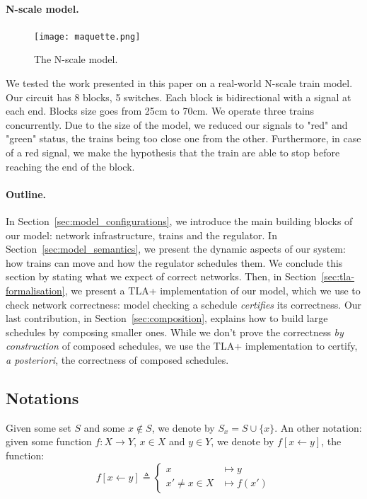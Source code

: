 \documentclass[runningheads]{llncs}
\begin{document}
\paragraph{N-scale model.}
\begin{figure}
	\begin{minipage}{0.28\textwidth}
		\centering
		\vspace{-8mm}
		\texttt{[image: maquette.png]}
		\caption{The N-scale model.}
	\end{minipage}
\end{figure}
We tested the work presented in this paper on a real-world N-scale train model. Our circuit has 8 blocks, 5 switches. Each block is bidirectional with a signal at each end. Blocks size goes from 25cm to 70cm. We operate three trains concurrently. Due to the size of the model, we reduced our signals  to "red" and "green" status, the trains being too close one from the other. Furthermore, in case of a red signal, we make the hypothesis that the train are able to stop before reaching the end of the block.

\paragraph{Outline.}
In Section~\ref{sec:model_configurations}, we introduce the main building blocks of our model: network infrastructure, trains and the regulator. In Section~\ref{sec:model_semantics}, we present the dynamic aspects of our system: how trains can move and how the regulator schedules them. We conclude this section by stating what we expect of correct networks. Then, in Section~\ref{sec:tla-formalisation}, we present a TLA+ implementation of our model, which we use to check network correctness: model checking a schedule \emph{certifies} its correctness. Our last contribution, in Section~\ref{sec:composition}, explains how to build large schedules by composing smaller ones. While we don't prove the correctness \emph{by construction} of composed schedules, we use the TLA+ implementation to certify, \emph{a posteriori}, the correctness of composed schedules.



\subsection{Notations}

Given some set $S$ and some $x \not\in S$, we denote by $S_x = S \cup \{ x\}$.  An other notation: given some function $f: X \to Y$, $x \in X$ and $y \in Y$, we denote by $f[x \leftarrow y]$, the function:
 $$f[x \leftarrow y] \triangleq \left\{  \begin{array}{ll} x &\mapsto y\\
x' \neq x \in X &\mapsto f(x')
\end{array}\right.$$
\end{document}
